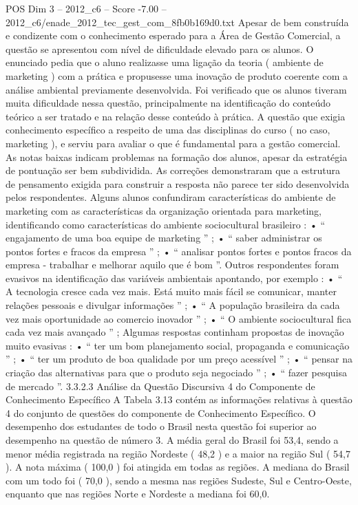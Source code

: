 \begin{textsample}{POS Dim 3 – 2012\_c6 – Score -7.00 – 2012\_c6/enade\_2012\_tec\_gest\_com\_8fb0b169d0.txt}
Apesar de bem construída e condizente com o conhecimento esperado para a Área de Gestão Comercial, a questão se apresentou com nível de dificuldade elevado para os alunos.
O enunciado pedia que o aluno realizasse uma ligação da teoria ( ambiente de marketing ) com a prática e propusesse uma inovação de produto coerente com a análise ambiental previamente desenvolvida.
Foi verificado que os alunos tiveram muita dificuldade nessa questão, principalmente na identificação do conteúdo teórico a ser tratado e na relação desse conteúdo à prática.
A questão que exigia conhecimento específico a respeito de uma das disciplinas do curso ( no caso, marketing ), e serviu para avaliar o que é fundamental para a gestão comercial.
As notas baixas indicam problemas na formação dos alunos, apesar da estratégia de pontuação ser bem subdividida.
As correções demonstraram que a estrutura de pensamento exigida para construir a resposta não parece ter sido desenvolvida pelos respondentes.
Alguns alunos confundiram características do ambiente de marketing com as características da organização orientada para marketing, identificando como características do ambiente sociocultural brasileiro : • “ engajamento de uma boa equipe de marketing ” ; • “ saber administrar os pontos fortes e fracos da empresa ” ; • “ analisar pontos fortes e pontos fracos da empresa - trabalhar e melhorar aquilo que é bom ”.
Outros respondentes foram evasivos na identificação das variáveis ambientais apontando, por exemplo : • “ A tecnologia cresce cada vez mais.
Está muito mais fácil se comunicar, manter relações pessoais e divulgar informações ” ; • “ A população brasileira da cada vez mais oportunidade ao comercio inovador ” ; • “ O ambiente sociocultural fica cada vez mais avançado ” ; Algumas respostas continham propostas de inovação muito evasivas : • “ ter um bom planejamento social, propaganda e comunicação ” ; • “ ter um produto de boa qualidade por um preço acessível ” ; • “ pensar na criação das alternativas para que o produto seja negociado ” ; • “ fazer pesquisa de mercado ”. 3.3.2.3 Análise da Questão Discursiva 4 do Componente de Conhecimento Específico A Tabela 3.13 contém as informações relativas à questão 4 do conjunto de questões do componente de Conhecimento Específico.
O desempenho dos estudantes de todo o Brasil nesta questão foi superior ao desempenho na questão de número 3.
A média geral do Brasil foi 53,4, sendo a menor média registrada na região Nordeste ( 48,2 ) e a maior na região Sul ( 54,7 ).
A nota máxima ( 100,0 ) foi atingida em todas as regiões.
A mediana do Brasil com um todo foi ( 70,0 ), sendo a mesma nas regiões Sudeste, Sul e Centro-Oeste, enquanto que nas regiões Norte e Nordeste a mediana foi 60,0.

\end{textsample}

